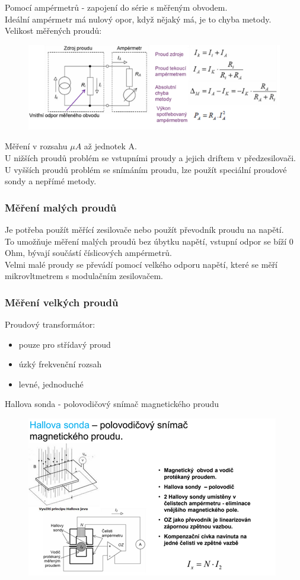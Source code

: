 Pomocí ampérmetrů - zapojení do série s měřeným obvodem.\\
Ideální ampérmetr má nulový opor, když nějaký má, je to chyba metody.\\
Velikost měřených proudů:
\begin{figure}[H]
    \includegraphics*[scale = 1.2]{images/Imereni.png}
\end{figure}
Měření v rozsahu $\mu A$ až jednotek A.\\
U nižších proudů problém se vstupními proudy a jejich driftem v předzesilovači.\\
U vyšších proudů problém se snímáním proudu, lze použít speciální proudové sondy a nepřímé metody.\\
\newpage

\subsubsection*{Měření malých proudů}
Je potřeba použít měřící zesilovače nebo použít převodník proudu na napětí.\\
To umožňuje měření malých proudů bez úbytku napětí, vstupní odpor se bíží 0 Ohm, bývají součástí číslicových ampérmetrů.\\
Velmi malé proudy se převádí pomocí velkého odporu napětí, které se měří mikrovltmetrem s modulačním zesilovačem.\\
\subsubsection*{Měření velkých proudů}
Proudový transformátor:
\begin{itemize}
    \item pouze pro střídavý proud 
    \item úzký frekvenční rozsah
    \item levné, jednoduché
\end{itemize}
Hallova sonda - polovodičový snímač magnetického proudu
\begin{figure}[H]
    \includegraphics*[scale = 1]{images/hallova_sonda.png}
\end{figure}


